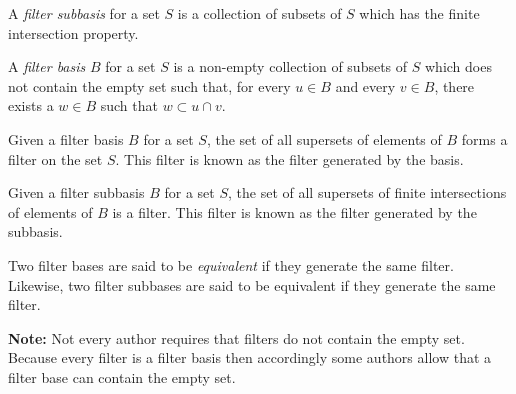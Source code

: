 \documentclass[12pt]{article}
\begin{document}
A \emph{filter subbasis} for a set $S$ is a collection of subsets of $S$ which has the finite intersection property.

A \emph{filter basis} $B$ for a set $S$ is a non-empty collection of subsets of $S$ which does not contain the empty set such that, for every $u \in B$ and every $v \in B$, there exists a $w \in B$ such that $w \subset u \cap v$.

Given a filter basis $B$ for a set $S$, the set of all supersets of elements of $B$ forms a filter on the set $S$.  This filter is known as the filter generated by the basis.

Given a filter subbasis $B$ for a set $S$, the set of all supersets of finite intersections of elements of $B$ is a filter.  This filter is known as the filter generated by the subbasis.

Two filter bases are said to be \emph{equivalent} if they generate the same filter.  Likewise, two filter subbases are said to be equivalent if they generate the same filter.

\textbf{Note:}  Not every author requires that filters do not contain the empty set. 
Because every filter is a filter basis then accordingly some authors allow that a filter 
base can contain the empty set.
\end{document}
